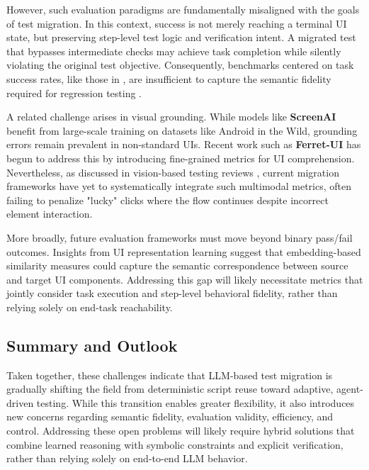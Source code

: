 \documentclass[acmsmall,nonacm]{acmart}
\begin{document}
However, such evaluation paradigms are fundamentally misaligned with the goals of test migration. In this context, success is not merely reaching a terminal UI state, but preserving step-level test logic and verification intent. A migrated test that bypasses intermediate checks may achieve task completion while silently violating the original test objective. Consequently, benchmarks centered on task success rates, like those in \cite{rawles2025androidworlddynamicbenchmarkingenvironment}, are insufficient to capture the semantic fidelity required for regression testing \cite{zhang2025largelanguagemodelbrainedgui}.

A related challenge arises in visual grounding. While models like \textbf{ScreenAI} \cite{baechler2024screenaivisionlanguagemodelui} benefit from large-scale training on datasets like Android in the Wild, grounding errors remain prevalent in non-standard UIs. Recent work such as \textbf{Ferret-UI} \cite{you2024ferretuigroundedmobileui} has begun to address this by introducing fine-grained metrics for UI comprehension. Nevertheless, as discussed in vision-based testing reviews \cite{yu2025visionbasedmobileappgui}, current migration frameworks have yet to systematically integrate such multimodal metrics, often failing to penalize "lucky" clicks where the flow continues despite incorrect element interaction.

More broadly, future evaluation frameworks must move beyond binary pass/fail outcomes. Insights from UI representation learning \cite{yu2025visionbasedmobileappgui} suggest that embedding-based similarity measures could capture the semantic correspondence between source and target UI components. Addressing this gap will likely necessitate metrics that jointly consider task execution and step-level behavioral fidelity, rather than relying solely on end-task reachability.

\subsection{Summary and Outlook}
Taken together, these challenges indicate that LLM-based test migration is gradually shifting the field from deterministic script reuse toward adaptive, agent-driven testing. While this transition enables greater flexibility, it also introduces new concerns regarding semantic fidelity, evaluation validity, efficiency, and control. Addressing these open problems will likely require hybrid solutions that combine learned reasoning with symbolic constraints and explicit verification, rather than relying solely on end-to-end LLM behavior.
\end{document}
